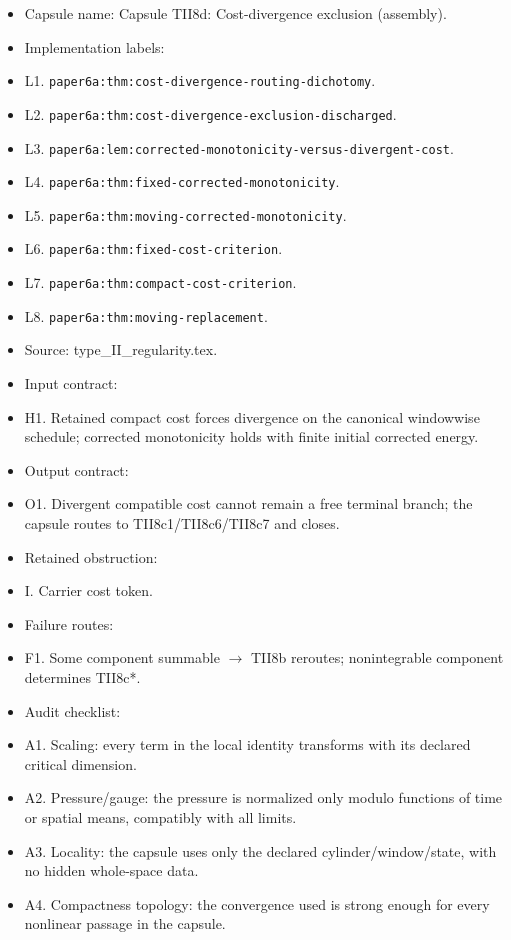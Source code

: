 \documentclass[11pt]{amsart}
\begin{document}
\begin{itemize}
  \item Capsule name: Capsule TII8d: Cost-divergence exclusion (assembly).
  \item Implementation labels:
  \item L1. \texttt{paper6a:thm:cost-divergence-routing-dichotomy}.
  \item L2. \texttt{paper6a:thm:cost-divergence-exclusion-discharged}.
  \item L3. \texttt{paper6a:lem:corrected-monotonicity-versus-divergent-cost}.
  \item L4. \texttt{paper6a:thm:fixed-corrected-monotonicity}.
  \item L5. \texttt{paper6a:thm:moving-corrected-monotonicity}.
  \item L6. \texttt{paper6a:thm:fixed-cost-criterion}.
  \item L7. \texttt{paper6a:thm:compact-cost-criterion}.
  \item L8. \texttt{paper6a:thm:moving-replacement}.
  \item Source: type\_II\_regularity.tex.
  \item Input contract:
  \item H1. Retained compact cost forces divergence on the canonical windowwise schedule; corrected monotonicity holds with finite initial corrected energy.
  \item Output contract:
  \item O1. Divergent compatible cost cannot remain a free terminal branch; the capsule routes to TII8c1/TII8c6/TII8c7 and closes.
  \item Retained obstruction:
  \item I. Carrier cost token.
  \item Failure routes:
  \item F1. Some component summable $\to$ TII8b reroutes; nonintegrable component determines TII8c*.
  \item Audit checklist:
  \item A1. Scaling: every term in the local identity transforms with its declared critical dimension.
  \item A2. Pressure/gauge: the pressure is normalized only modulo functions of time or spatial means, compatibly with all limits.
  \item A3. Locality: the capsule uses only the declared cylinder/window/state, with no hidden whole-space data.
  \item A4. Compactness topology: the convergence used is strong enough for every nonlinear passage in the capsule.

\end{itemize}
\end{document}
